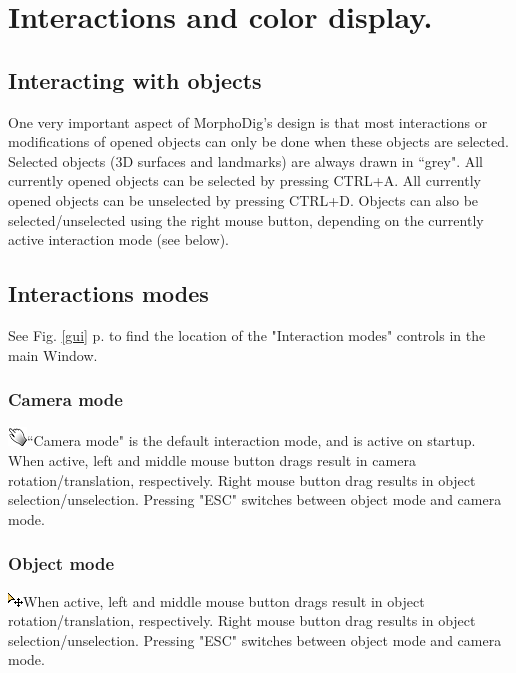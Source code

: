 \chapter{Interactions and color display. }
\minitoc  


\section{Interacting with objects}
One very important aspect of MorphoDig's design is that most interactions or modifications of opened objects can only be done when these objects are selected. 
Selected objects (3D surfaces and landmarks) are always drawn in ``grey". All currently opened objects can be selected by pressing CTRL+A. All currently opened objects can be unselected by pressing CTRL+D. Objects can also be selected/unselected using the right mouse button, depending on the currently active interaction mode (see below).



\section{Interactions modes}

See Fig. \ref{gui} p.\pageref{gui} to find the location of the "Interaction modes" controls in the main Window.
\subsection{Camera mode}
  \includegraphics[scale=0.7]{images/04/camera_mode.png}``Camera mode" is the default interaction mode, and is active on startup. When active, left and middle mouse button drags result in camera rotation/translation, respectively. Right mouse button drag results in object selection/unselection. Pressing "ESC" switches between object mode and camera mode.
\subsection{Object mode}
   \includegraphics[scale=0.7]{images/04/move_mode.png}When active, left and middle mouse button drags result in object rotation/translation, respectively. Right mouse button drag results in object selection/unselection. Pressing "ESC" switches between object mode and camera mode.
